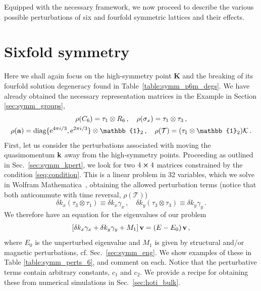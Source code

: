 Equipped with the necessary framework, we now proceed to describe the various possible perturbations of six and fourfold symmetric lattices and their effects.

\section{Sixfold symmetry} \label{sec:symm_sixfold}
Here we shall again focus on the high-symmetry point $\boldsymbol{K}$ and the breaking of its fourfold solution degeneracy found in Table~\ref{table:symm_p6m_degs}.
We have already obtained the necessary representation matrices in the Example in Section \ref{sec:symm_groups},
\begin{equation} \label{eq:symm_six_rhos}
\begin{gathered}
\rho(C_6) = \tau_1 \otimes R_6 \, , \quad  \rho(\sigma_x) = \tau_1 \otimes \tau_3 \, , \\
\rho(\vb{a}) = \text{diag}\{ \e^{4 \pi i /3}, \e^{2 \pi i / 3} \} \otimes \mathbb{1}_2 \, , \quad \rho(\mathcal{T}) = (\tau_1 \otimes \mathbb{1}_2) \mathcal{K} \,.
\end{gathered}
\end{equation}
First, let us consider the perturbations associated with moving the quasimomentum $\vb{k}$ away from the high-symmetry points. Proceeding as outlined in Sec.~\ref{sec:symm_kpert}, we look for two $4 \cross 4$ matrices constrained by the condition \eqref{seq:condition}. This is a linear problem in 32 variables, which we solve in Wolfram Mathematica~\cite{Mathematica}, obtaining the allowed perturbation terms (notice that both anticommute with time reversal, $\rho(\mathcal{T})$)\textit{}
\begin{equation}
\delta k_x \left(\tau_3 \otimes \tau_1 \right) \equiv \delta k_x \gamma_x \,, \quad \delta  k_y \left(\tau_3 \otimes \tau_3 \right) \equiv \delta  k_y \gamma_y \,.
\end{equation} 
%
We therefore have an equation for the eigenvalues of our problem
%
\begin{equation} \label{eq:symm_ham}
\left[ \delta k_x \gamma_x + \delta k_y \gamma_y + M_1 \right] \vb{v} = (E-E_0) \,\vb{v} \,,
\end{equation}
where $E_0$ is the unperturbed eigenvalue and $M_1$ is given by structural and/or magnetic perturbations, cf. Sec.~\ref{sec:symm_eng}. We show examples of these in Table \ref{table:symm_perts_6}, and comment on each. Notice that the perturbative terms contain arbitrary constants, $c_1$ and $c_2$. We provide a recipe for obtaining these from numerical simulations in Sec.~\ref{sec:hoti_bulk}. 

